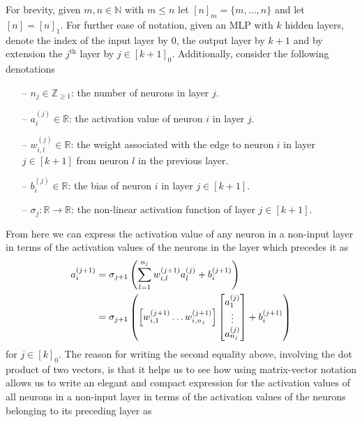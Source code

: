 \documentclass[11pt]{article}
\begin{document}
For brevity, given $m,n\in\mathbb{N}$ with $m\leq n$ let $[n]_m=\{m,\dots,n\}$ and let $[n]=[n]_1$. For further ease of notation, given an MLP with $k$ hidden layers, denote the index of the input layer by $0$, the output layer by $k+1$ and by extension the $j^{\text{th}}$ layer by $j\in[k+1]_0$. Additionally, consider the following denotations
\begin{itemize}
    \item[--] $n_j\in\mathbb{Z}_{\geq1}$: the number of neurons in layer $j$.
    \item[--] $a_i^{(j)}\in\mathbb{R}$: the activation value of neuron $i$ in layer $j$.
    \item[--] $w_{i,l}^{(j)}\in\mathbb{R}$: the weight associated with the edge to neuron $i$ in layer $j\in[k+1]$ from neuron $l$ in the previous layer.
    \item[--] $b_i^{(j)}\in\mathbb{R}$: the bias of neuron $i$ in layer $j\in[k+1]$.
    \item[--] $\sigma_j:\mathbb{R}\rightarrow\mathbb{R}$: the non-linear activation function of layer $j\in[k+1]$.
\end{itemize}
From here we can express the activation value of any neuron in a non-input layer in terms of the activation values of the neurons in the layer which precedes it as
\begin{align*}
    a_i^{(j+1)}
    &=
    \sigma_{j+1}\left(
    \sum_{l=1}^{n_j} w_{i,l}^{(j+1)}a_l^{(j)} + b_i^{(j+1)}
    \right)\\
    &=
    \sigma_{j+1}\left(
    \left[w_{i,1}^{(j+1)} \dots w_{i,n_j}^{(j+1)}\right]
    \begin{bmatrix}
        a_1^{(j)}\\
        \vdots\\
        a_{n_j}^{(j)}
    \end{bmatrix}
    +
    b_i^{(j+1)}
\right)
\end{align*}
for $j\in[k]_0$. The reason for writing the second equality above, involving the dot product of two vectors, is that it helps us to see how using matrix-vector notation allows us to write an elegant and compact expression for the activation values of all neurons in a non-input layer in terms of the activation values of the neurons belonging to its preceding layer as
\end{document}
